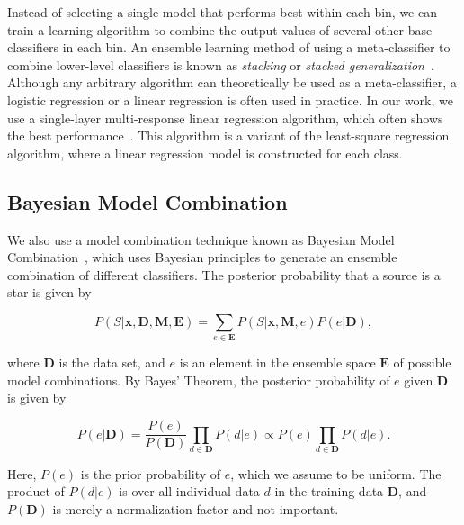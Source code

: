 Instead of selecting a single model that performs best within each bin,
we can train a learning algorithm to combine the output values of
several other base classifiers in each bin.
An ensemble learning method of using a meta-classifier
to combine lower-level classifiers is known as \textit{stacking}
or \textit{stacked generalization}~\citep{wolpert1992stacked}.
Although any arbitrary algorithm
can theoretically be used as a meta-classifier,
a logistic regression or a linear regression is often used
in practice.
In our work,
we use a single-layer multi-response linear regression algorithm,
which often shows the best performance~\citep{breiman1996stacked,
ting1999issues}. 
This algorithm
is a variant of the least-square regression algorithm,
where a linear regression model is constructed for each class.


\subsection{Bayesian Model Combination}

We also use a model combination technique known as
Bayesian Model Combination~\citep[BMC;][]{Monteith2011}, which
uses Bayesian principles to generate an ensemble combination of
different classifiers.
The posterior probability that a source is a star is given by

\begin{equation} \label{eq:p_star_bmc}
  P \left(S | \mathbf{x}, \mathbf{D}, \mathbf{M}, \mathbf{E} \right)
  = \sum_{e \in \mathbf{E}} P \left(S | \mathbf{x}, \mathbf{M}, e \right)
  P \left(e | \mathbf{D} \right),
\end{equation}

\noindent
where $\mathbf{D}$ is the data set,
and $e$ is an element in the ensemble space $\mathbf{E}$ of possible model combinations.
By Bayes' Theorem, the posterior probability of $e$ given $\mathbf{D}$ is given by

\begin{equation} \label{eq:p_ensemble}
  P \left(e | \mathbf{D} \right)
  = \frac{P \left(e \right)}{P \left(\mathbf{D} \right)}
  \prod_{d \in \mathbf{D}} P \left( d | e \right)
  \propto P \left(e\right) \prod_{d \in \mathbf{D}} P \left(d | e \right).
\end{equation}

\noindent
Here, $P\left(e \right)$ is the prior probability of $e$,
which we assume to be uniform.
The product of $P\left(d | e\right)$ is
over all individual data $d$ in the training data $\mathbf{D}$,
and $P\left(\mathbf{D}\right)$ is merely a normalization factor
and not important.

